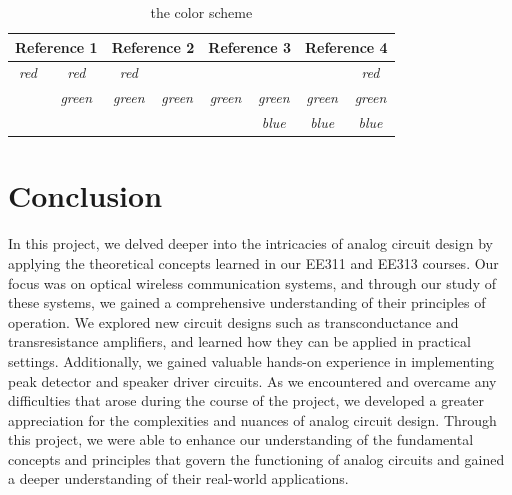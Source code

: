 \documentclass[a4paper,10pt]{IEEEtran}
\begin{document}
\begin{table}[]
    \caption{the color scheme}
    \label{tab:array}
    \begin{tabular}{|cc|cc|cc|cc|}
    \hline
    \multicolumn{2}{|c|}{\textbf{Reference 1}}          & \multicolumn{2}{c|}{\textbf{Reference 2}}            & \multicolumn{2}{c|}{\textbf{Reference 3}}            & \multicolumn{2}{c|}{\textbf{Reference 4}}            \\ \hline
    \multicolumn{1}{|c|}{\textit{red}} & \textit{red}   & \multicolumn{1}{c|}{\textit{red}}   & \textit{}      & \multicolumn{1}{c|}{\textit{}}      & \textit{}      & \multicolumn{1}{c|}{\textit{}}      & \textit{red}   \\ \hline
    \multicolumn{1}{|c|}{\textit{}}    & \textit{green} & \multicolumn{1}{c|}{\textit{green}} & \textit{green} & \multicolumn{1}{c|}{\textit{green}} & \textit{green} & \multicolumn{1}{c|}{\textit{green}} & \textit{green} \\ \hline
    \multicolumn{1}{|c|}{\textit{}}    & \textit{}      & \multicolumn{1}{c|}{\textit{}}      & \textit{}      & \multicolumn{1}{c|}{\textit{}}      & \textit{blue}  & \multicolumn{1}{c|}{\textit{blue}}  & \textit{blue}  \\ \hline
    \end{tabular}
\end{table}
    
\section{Conclusion}
In this project, we delved deeper into the intricacies of analog circuit design by applying the theoretical concepts learned in our EE311 and EE313 courses. Our focus was on optical wireless communication systems, and through our study of these systems, we gained a comprehensive understanding of their principles of operation. We explored new circuit designs such as transconductance and transresistance amplifiers, and learned how they can be applied in practical settings. Additionally, we gained valuable hands-on experience in implementing peak detector and speaker driver circuits. As we encountered and overcame any difficulties that arose during the course of the project, we developed a greater appreciation for the complexities and nuances of analog circuit design. Through this project, we were able to enhance our understanding of the fundamental concepts and principles that govern the functioning of analog circuits and gained a deeper understanding of their real-world applications.
\end{document}
